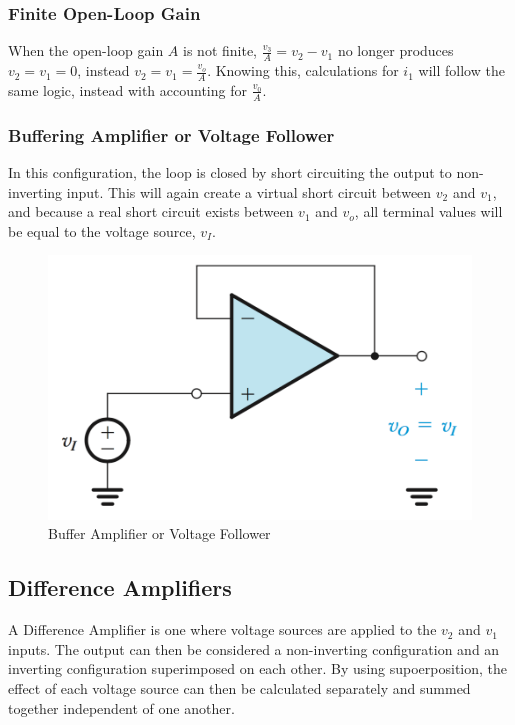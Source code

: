 \documentclass[11pt]{article}
\begin{document}
    \subsubsection{Finite Open-Loop Gain}

    When the open-loop gain $A$ is not finite, $\frac{v_3}{A} = v_2-v_1$ no longer produces $v_2 = v_1 = 0$, instead $v_2 = v_1 = \frac{v_o}{A}$. Knowing this, calculations for $i_1$ will follow the same logic, instead with accounting for $\frac{v_0}{A}$.

    \subsubsection{Buffering Amplifier or Voltage Follower}
    
    In this configuration, the loop is closed by short circuiting the output to non-inverting input. This will again create a virtual short circuit between $v_2$ and $v_1$, and because a real short circuit exists between $v_1$ and $v_o$, all terminal values will be equal to the voltage source, $v_I$. \\
    
    \begin{figure}[h]
        \centering
        \includegraphics[width=\textwidth]{buff}
        \caption{Buffer Amplifier or Voltage Follower}
        \label{fig:voltage follower}
    \end{figure}

    \subsection{Difference Amplifiers}
    A Difference Amplifier is one where voltage sources are applied to the $v_2$ and $v_1$ inputs. The output can then be considered a non-inverting configuration and an inverting configuration superimposed on each other. By using supoerposition, the effect of each voltage source can then be calculated separately and summed together independent of one another. \\
\end{document}
